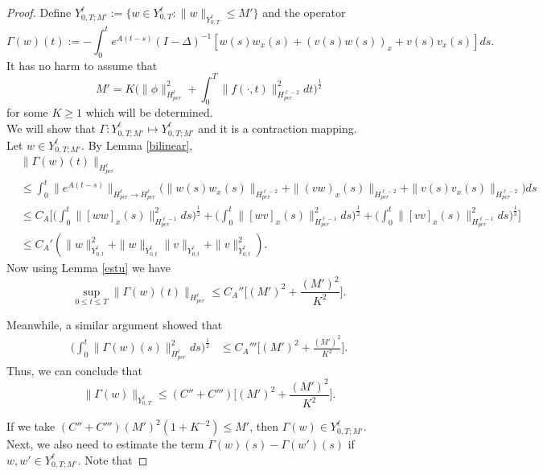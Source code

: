 \documentclass[10pt,a4paper]{amsart}
\begin{document}
\begin{proof}
Define $Y^{\ell}_{0,T;M'}:=\{w\in Y^{\ell}_{0,T}: \|w\|_{Y^{\ell}_{0,T}}\leq M'\}$ and the operator 
$$\Gamma(w)(t):=-\int_0^t e^{A(t-s)}(I-\Delta)^{-1}[w(s)w_x(s)+(v(s)w(s))_x+v(s)v_x(s)]ds. $$ It has no harm to assume that 
$$M'=K\bigg(\|\phi\|_{H^{\ell}_{per}}^2+\int_0^T\|f(\cdot,t)\|_{H^{\ell-2}_{per}}^2dt\bigg)^{\frac12}$$
for some $K\geq1$ which will be determined. \\

We will show that $\Gamma: Y^{\ell}_{0,T;M'}\mapsto Y^{\ell}_{0,T;M'}$ and it is a contraction mapping. \\

Let $w\in Y^{\ell}_{0,T;M'}$. By Lemma \ref{bilinear}, 
\begin{align*}
& \|\Gamma(w)(t)\|_{H^{\ell}_{per}}\\
&\leq \int_0^t\|e^{A(t-s)}\|_{H^{\ell}_{per}\to H^{\ell}_{per}}\bigg(\|w(s)w_x(s)\|_{H^{\ell-2}_{per}}+\|(vw)_x(s)\|_{H^{\ell-2}_{per}}+\|v(s)v_x(s)\|_{H^{\ell-2}_{per}}\bigg)ds\\
&\leq C_A\bigg[\bigg(\int_0^t\|[ww]_x(s)\|_{H^{\ell-1}_{per}}^2ds\bigg)^{\frac12}+\bigg(\int_0^t\|[wv]_x(s)\|_{H^{\ell-1}_{per}}^2ds\bigg)^{\frac12} +\bigg(\int_0^t\|[vv]_x(s)\|_{H^{\ell-1}_{per}}^2ds\bigg)^{\frac12}\bigg]\\
&\leq C_A'(\|w\|_{Y^{\ell}_{0,t}}^2+\|w\|_{Y^{\ell}_{0,t}}\|v\|_{Y^{\ell}_{0,t}}+\|v\|_{Y^{\ell}_{0,t}}^2).
\end{align*}
Now using Lemma \ref{estu} we have 
$$\sup_{0\leq t\leq T}\|\Gamma(w)(t)\|_{H^{\ell}_{per}}\leq C_A''\bigg[(M')^2+\frac{(M')^2}{K^2}\bigg].$$

Meanwhile, a similar argument showed that 
\begin{align*}
    \bigg(\int_0^t \|\Gamma(w)(s)\|_{H^{\ell}_{per}}^2ds\bigg)^{\frac12} &\leq C_A'''\bigg[(M')^2+\frac{(M')^2}{K^2}\bigg].
\end{align*}
Thus, we can conclude that 
$$\|\Gamma(w)\|_{Y^{\ell}_{0,T}}\leq (C''+C''')\bigg[(M')^2+\frac{(M')^2}{K^2}\bigg].$$

If we take $(C''+C''')(M')^2(1+K^{-2})\leq M'$, then $\Gamma(w)\in Y^{\ell}_{0,T;M'}$.\\

Next, we also need to estimate the term $\Gamma(w)(s)-\Gamma(w')(s)$ if $w,w'\in Y^{\ell}_{0,T;M'}$. Note that 


\end{proof}
\end{document}
